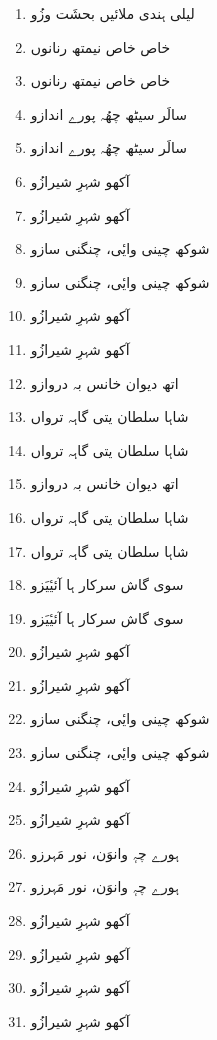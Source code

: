 \documentclass[12pt]{article}
\newcommand{\bigarabic}[1]{\fontsize{16pt}{18pt}\selectfont \textarabic{#1}}
\begin{document}
\begin{multicols}{2}
\begin{RTL}
\begin{enumerate}[leftmargin=*, label=\arabic*., font=\fontsize{16pt}{18pt}\selectfont]
  \item \bigarabic{لیلی ہندی ملائیں بحشَت وزُو}
  \item \bigarabic{خاص خاص نیمتھ رنانوں}
  \item \bigarabic{خاص خاص نیمتھ رنانوں}
  \item \bigarabic{سالَر سیٹھ چھُہ پورے اندازو}
  \item \bigarabic{سالَر سیٹھ چھُہ پورے اندازو}
  \item \bigarabic{آکھو شہرِ شیرازُو}
  \item \bigarabic{آکھو شہرِ شیرازُو}
  \item \bigarabic{شوکھ چینی وایٔی، چنگنی سازو}
  \item \bigarabic{شوکھ چینی وایٔی، چنگنی سازو}
  \item \bigarabic{آکھو شہرِ شیرازُو}
  \item \bigarabic{آکھو شہرِ شیرازُو}
  \item \bigarabic{اتھ دیوان خانس بہ دروازو}
  \item \bigarabic{شاہا سلطان یتی گاہہ ترواں}
  \item \bigarabic{شاہا سلطان یتی گاہہ ترواں}
  \item \bigarabic{اتھ دیوان خانس بہ دروازو}
  \item \bigarabic{شاہا سلطان یتی گاہہ ترواں}
  \item \bigarabic{شاہا سلطان یتی گاہہ ترواں}
  \item \bigarabic{سوی گاش سرکار ہا آئیٔیَزو}
  \item \bigarabic{سوی گاش سرکار ہا آئیٔیَزو}
  \item \bigarabic{آکھو شہرِ شیرازُو}
  \item \bigarabic{آکھو شہرِ شیرازُو}
  \item \bigarabic{شوکھ چینی وایٔی، چنگنی سازو}
  \item \bigarabic{شوکھ چینی وایٔی، چنگنی سازو}
  \item \bigarabic{آکھو شہرِ شیرازُو}
  \item \bigarabic{آکھو شہرِ شیرازُو}
  \item \bigarabic{ہورے چہٕ وانوَن، نور مَہرزو}
  \item \bigarabic{ہورے چہٕ وانوَن، نور مَہرزو}
  \item \bigarabic{آکھو شہرِ شیرازُو}
  \item \bigarabic{آکھو شہرِ شیرازُو}
  \item \bigarabic{آکھو شہرِ شیرازُو}
  \item \bigarabic{آکھو شہرِ شیرازُو}
\end{enumerate}
\end{RTL}
\end{multicols}
\end{document}
